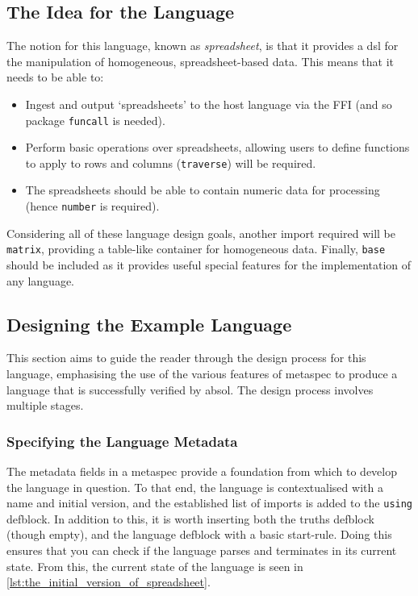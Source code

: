 \subsection{The Idea for the Language} %
\label{sub:the_idea_for_the_language}
The notion for this language, known as \textit{spreadsheet}, is that it provides a \gls{dsl} for the manipulation of homogeneous, spreadsheet-based data. 
This means that it needs to be able to:
\begin{itemize}
    \item Ingest and output `spreadsheets' to the host language via the FFI (and so package \texttt{funcall} is needed).
    \item Perform basic operations over spreadsheets, allowing users to define functions to apply to rows and columns (\texttt{traverse}) will be required. 
    \item The spreadsheets should be able to contain numeric data for processing (hence \texttt{number} is required). 
\end{itemize}

Considering all of these language design goals, another import required will be \texttt{matrix}, providing a table-like container for homogeneous data. 
Finally, \texttt{base} should be included as it provides useful special features for the implementation of any language. 


\subsection{Designing the Example Language} %
\label{sub:designing_the_example_language}
This section aims to guide the reader through the design process for this language, emphasising the use of the various features of \gls{metaspec} to produce a language that is successfully verified by \gls{absol}. 
The design process involves multiple stages. 

\subsubsection{Specifying the Language Metadata} %
\label{ssub:specifying_the_language_metadata}
The metadata fields in a \gls{metaspec} provide a foundation from which to develop the language in question. 
To that end, the language is contextualised with a name and initial version, and the established list of imports is added to the \texttt{using} defblock. 
In addition to this, it is worth inserting both the truths defblock (though empty), and the language defblock with a basic start-rule. 
Doing this ensures that you can check if the language parses and terminates in its current state.
From this, the current state of the language is seen in \autoref{lst:the_initial_version_of_spreadsheet}. 

